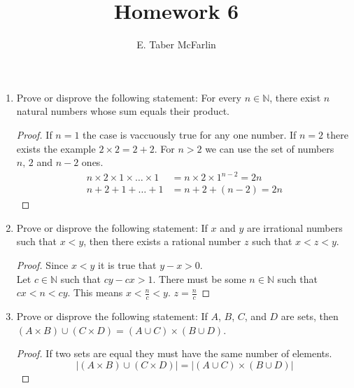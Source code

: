 \documentclass[12pt,a4paper,reqno,parskip=full]{amsart}
\numberwithin{equation}{section}
\theoremstyle{plain}
\theoremstyle{definition}
\begin{document}
\title{Homework 6}

\author{E. Taber McFarlin}

\maketitle

\begin{enumerate}
  \item Prove or disprove the following statement: For every $n\in\mathbb{N}$, there exist $n$
        natural numbers whose sum equals their product.
        \begin{proof}
          If $n = 1$ the case is vaccuously true for any one number. If $n = 2$ there exists the
          example $2 \times 2 = 2 + 2$. For $n > 2$ we can use the set of numbers $n,\,2$ and $n-2$
          ones.
          \begin{align*}
            n \times 2 \times 1 \times \dots \times 1 & = n \times 2 \times 1^{n-2} = 2n \\
            n + 2 + 1 + \dots + 1                     & = n + 2 + (n - 2) = 2n
          \end{align*}
        \end{proof}
  \item Prove or disprove the following statement: If $x$ and $y$ are irrational numbers such that
        $x < y$, then there exists a rational number $z$ such that $x<z<y$.
        \begin{proof} Since $x < y$ it is true that $y - x > 0$. \\
          Let $c\in\mathbb{N}$ such that $cy - cx > 1$. There must be some $n\in\mathbb{N}$ such
          that $cx<n<cy$. This means $\displaystyle x<\frac{n}{c}<y$. $\displaystyle z=\frac{n}{c}$
        \end{proof}
  \item Prove or disprove the following statement: If $A$, $B$, $C$, and $D$ are sets, then
        $(A\times B)\cup(C\times D)=(A\cup C)\times(B\cup D)$.
        \begin{proof}
          If two sets are equal they must have the same number of elements.
          \[|(A\times B)\cup(C\times D)| = |(A\cup C)\times(B\cup D)|\]


\end{proof}
\end{enumerate}
\end{document}
